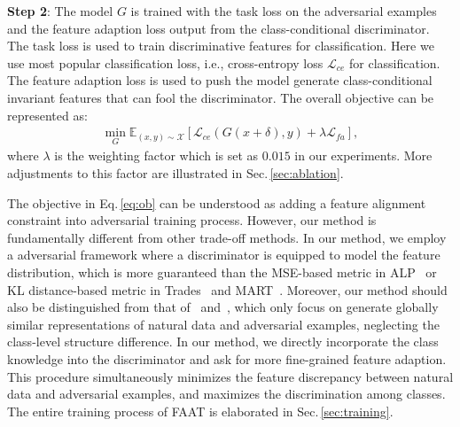 \documentclass[10pt,twocolumn,letterpaper]{article}
\begin{document}
\textbf{Step 2}: The model $G$ is trained with the task loss on the adversarial examples and the feature adaption loss output from the class-conditional discriminator. The task loss is used to train discriminative features for classification. Here we use most popular classification loss, i.e., cross-entropy loss $\mathcal{L}_{ce}$ for classification. The feature adaption loss is used to push the model generate class-conditional invariant features that can fool the discriminator. The overall objective can be represented as:
\begin{equation}
\begin{aligned}
\label{eq:ob}
		\min _{G} \mathbb{E}_{(x, y) \sim \mathcal{X}}[ \mathcal{L}_{ce}(G( x+\delta), y)+\lambda\mathcal{L}_{fa}],
\end{aligned}
\end{equation}
where $\lambda$ is the weighting factor which is set as $0.015$ in our experiments. More adjustments to this factor are illustrated in Sec.\,\ref{sec:ablation}. 

The objective in Eq.\,\eqref{eq:ob} can be understood as adding a feature alignment constraint into adversarial training process. However, our method is fundamentally different from other trade-off methods. In our method, we employ a adversarial framework where a discriminator is equipped to model the feature distribution, which is more guaranteed than the MSE-based metric in ALP~\cite{58kannan2018adversarial} or KL distance-based metric in Trades~\cite{Zhang2019tradeoff} and MART~\cite{Wang2020Improving}. Moreover, our method should also be distinguished from that of~\cite{levi2021domain} and~\cite{qian2021improving}, which only focus on generate globally similar representations of natural data and adversarial examples, neglecting the class-level structure difference. In our method, we directly incorporate the class knowledge into the discriminator and ask for more fine-grained feature adaption. This procedure simultaneously minimizes the feature discrepancy between natural data and adversarial examples, and maximizes the discrimination among classes. The entire training process of FAAT is elaborated in Sec.\,\ref{sec:training}.
\end{document}
